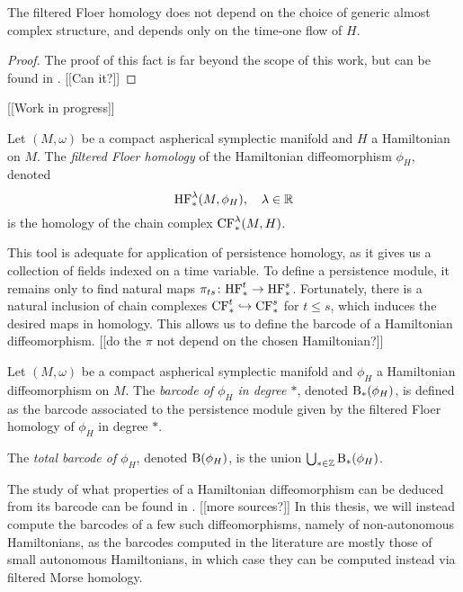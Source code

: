 \begin{prop}
The filtered Floer homology does not depend on the choice of generic almost complex structure, and depends only on the time-one flow of $H$.
\end{prop}

\begin{proof}
The proof of this fact is far beyond the scope of this work, but can be found in \cite{schwarz}. [[Can it?]]
\end{proof}

[[Work in progress]]

\begin{definition}
Let $(M,\omega)$ be a compact aspherical symplectic manifold and $H$ a Hamiltonian on $M$. The \emph{filtered Floer homology} of the Hamiltonian diffeomorphism $\phi_H$, denoted
\begin{equation}
\mathrm{HF}^\lambda_*(M,\phi_H), \quad \lambda \in \mathbb{R}
\end{equation}
is the homology of the chain complex $\mathrm{CF}^\lambda_*(M,H)$.
\end{definition}

This tool is adequate for application of persistence homology, as it gives us a collection of fields indexed on a time variable. To define a persistence module, it remains only to find natural maps $\pi_{ts} \colon \mathrm{HF}^t_* \to \mathrm{HF}^s_*$. Fortunately, there is a natural inclusion of chain complexes $\mathrm{CF}^t_* \hookrightarrow \mathrm{CF}^s_*$ for $t \leq s$, which induces the desired maps in homology. This allows us to define the barcode of a Hamiltonian diffeomorphism. [[do the $\pi$ not depend on the chosen Hamiltonian?]]

\begin{definition}
Let $(M,\omega)$ be a compact aspherical symplectic manifold and $\phi_H$ a Hamiltonian diffeomorphism on $M$. The \emph{barcode of $\phi_H$ in degree $*$}, denoted $\mathrm{B}_*(\phi_H)$, is defined as the barcode associated to the persistence module given by the filtered Floer homology of $\phi_H$ in degree $*$.

The \emph{total barcode of $\phi_H$}, denoted $\mathrm{B}(\phi_H)$, is the union $\bigcup_{* \in \mathbb{Z}} \mathrm{B}_*(\phi_H)$.
\end{definition}

The study of what properties of a Hamiltonian diffeomorphism can be deduced from its barcode can be found in \cite{polterovich}. [[more sources?]] In this thesis, we will instead compute the barcodes of a few such diffeomorphisms, namely of non-autonomous Hamiltonians, as the barcodes computed in the literature are mostly those of small autonomous Hamiltonians, in which case they can be computed instead via filtered Morse homology.